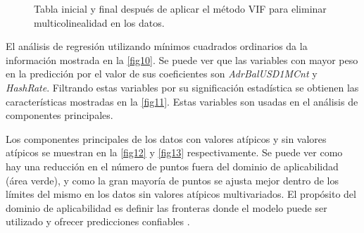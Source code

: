 \begin{figure}[!h]
	\centering
	\qquad
	\caption{Tabla inicial y final después de aplicar el método VIF para eliminar multicolinealidad en los datos.}
	\label{fig8}
\end{figure}

El análisis de regresión utilizando mínimos cuadrados ordinarios da la información mostrada en la \cref{fig10}. Se puede ver que las variables con mayor peso en la predicción por el valor de sus coeficientes son \textit{AdrBalUSD1MCnt} y \textit{HashRate}.
Filtrando estas variables por su significación estadística se obtienen las características mostradas en la \cref{fig11}. Estas variables son usadas en el análisis de componentes principales.


Los componentes principales de los datos con valores atípicos y sin valores atípicos se muestran en la \cref{fig12} y \cref{fig13} respectivamente. Se puede ver como hay una reducción en el número de puntos fuera del dominio de aplicabilidad (área verde), y como la gran mayoría de puntos se ajusta mejor dentro de los límites del mismo en los datos sin valores atípicos multivariados. El propósito del dominio de aplicabilidad es definir las fronteras donde el modelo puede ser utilizado y ofrecer predicciones confiables \parencite{karApplicabilityDomainStep2018}.

